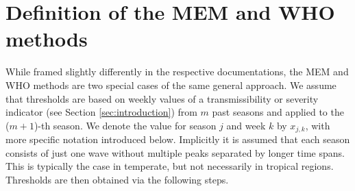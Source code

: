 \documentclass[12pt]{article}
\begin{document}
\section{Definition of the MEM and WHO methods}
\label{sec:definitions}

While framed slightly differently in the respective documentations, the MEM and WHO methods are two special cases of the same general approach. We assume that thresholds are based on weekly values of a transmissibility or severity indicator (see Section \ref{sec:introduction}) from $m$ past seasons and applied to the ($m + 1$)-th season.  We denote the value for season $j$ and week $k$ by $x_{j, k}$, with more specific notation introduced below. Implicitly it is assumed that each season consists of just one wave without multiple peaks separated by longer time spans. This is typically the case in temperate, but not necessarily in tropical regions. Thresholds are then obtained via the following steps.
\end{document}

